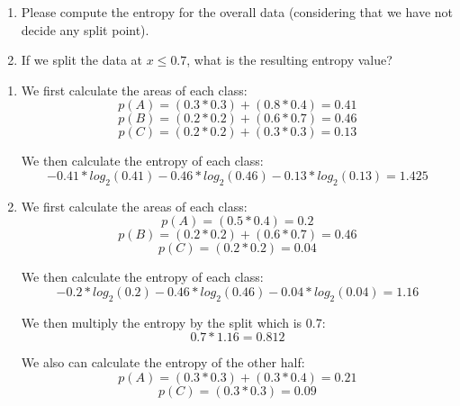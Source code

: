 \documentclass{article}
\begin{document}
\begin{enumerate}[label=(\alph*)]
    \item Please compute the entropy for the overall data (considering that we have not decide any split point).
    \item If we split the data at $x \le 0.7$, what is the resulting entropy value?
\end{enumerate}

\begin{enumerate}[label=(\alph*)]
    \item We first calculate the areas of each class:
    \begin{equation}
        p(A) = (0.3 * 0.3) + (0.8 * 0.4) = 0.41
    \end{equation}
    \begin{equation}
        p(B) = (0.2 * 0.2) + (0.6 * 0.7) = 0.46
    \end{equation}
    \begin{equation}
        p(C) = (0.2 * 0.2) + (0.3 * 0.3) = 0.13
    \end{equation}

    We then calculate the entropy of each class:
    \begin{equation}
        -0.41 * log_2(0.41) - 0.46 * log_2(0.46) - 0.13 * log_2(0.13) = 1.425
    \end{equation}

    \item We first calculate the areas of each class:
    \begin{equation}
        p(A) = (0.5 * 0.4) = 0.2
    \end{equation}
    \begin{equation}
        p(B) = (0.2 * 0.2) + (0.6 * 0.7) = 0.46
    \end{equation}
    \begin{equation}
        p(C) = (0.2 * 0.2) = 0.04
    \end{equation}

    We then calculate the entropy of each class:
    \begin{equation}
        -0.2 * log_2(0.2) - 0.46 * log_2(0.46) - 0.04 * log_2(0.04) = 1.16
    \end{equation}

    We then multiply the entropy by the split which is 0.7:
    \begin{equation}
        0.7 * 1.16 = 0.812
    \end{equation}

    We also can calculate the entropy of the other half:
    \begin{equation}
        p(A) = (0.3 * 0.3) + (0.3 * 0.4) = 0.21
    \end{equation}
    \begin{equation}
        p(C) = (0.3 * 0.3) = 0.09
    \end{equation}


\end{enumerate}
\end{document}
